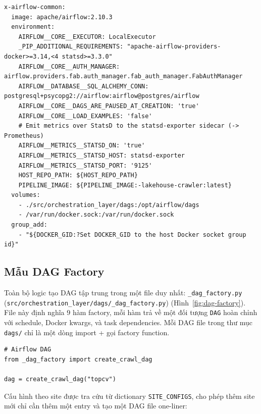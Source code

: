 \begin{lstlisting}[style=bashstyle, caption={Cấu hình biến môi trường (docker-compose.yaml)}]
x-airflow-common:
  image: apache/airflow:2.10.3
  environment:
    AIRFLOW__CORE__EXECUTOR: LocalExecutor
    _PIP_ADDITIONAL_REQUIREMENTS: "apache-airflow-providers-docker>=3.14,<4 statsd>=3.3.0"
    AIRFLOW__CORE__AUTH_MANAGER: airflow.providers.fab.auth_manager.fab_auth_manager.FabAuthManager
    AIRFLOW__DATABASE__SQL_ALCHEMY_CONN: postgresql+psycopg2://airflow:airflow@postgres/airflow
    AIRFLOW__CORE__DAGS_ARE_PAUSED_AT_CREATION: 'true'
    AIRFLOW__CORE__LOAD_EXAMPLES: 'false'
    # Emit metrics over StatsD to the statsd-exporter sidecar (-> Prometheus)
    AIRFLOW__METRICS__STATSD_ON: 'true'
    AIRFLOW__METRICS__STATSD_HOST: statsd-exporter
    AIRFLOW__METRICS__STATSD_PORT: '9125'
    HOST_REPO_PATH: ${HOST_REPO_PATH}
    PIPELINE_IMAGE: ${PIPELINE_IMAGE:-lakehouse-crawler:latest}
  volumes:
    - ./src/orchestration_layer/dags:/opt/airflow/dags
    - /var/run/docker.sock:/var/run/docker.sock
  group_add:
    - "${DOCKER_GID:?Set DOCKER_GID to the host Docker socket group id}"
\end{lstlisting}


\subsection{Mẫu DAG Factory}
\label{subsec:dag-factory}

Toàn bộ logic tạo DAG tập trung trong một file duy nhất:
\texttt{\_dag\_factory.py} (\texttt{src/orchestration\_layer/dags/\_dag\_factory.py})
(Hình~\ref{fig:dag-factory}). File này định nghĩa 9 hàm factory, mỗi hàm trả về
một đối tượng \texttt{DAG} hoàn chỉnh với schedule, Docker kwargs, và task
dependencies. Mỗi DAG file trong thư mục \texttt{dags/} chỉ là một dòng import
+ gọi factory function.

\begin{lstlisting}[style=pystyle, caption={Mẫu one-liner DAG file (crawl\_topcv.py)}]
# Airflow DAG
from _dag_factory import create_crawl_dag

dag = create_crawl_dag("topcv")
\end{lstlisting}

Cấu hình theo site được tra cứu từ dictionary \texttt{SITE\_CONFIGS}, cho phép thêm
site mới chỉ cần thêm một entry và tạo một DAG file one-liner:

